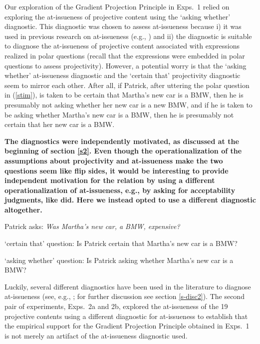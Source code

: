 \documentclass[11pt,fleqn]{article}
\newcommand{\6}{\mbox{$[\hspace*{-.6mm}[$}}
\newcommand{\9}{\mbox{$]\hspace*{-.6mm}]$}}
\begin{document}
Our exploration of the Gradient Projection Principle in Exps.~1 relied on exploring the at-issueness of projective content using the `asking whether' diagnostic. This diagnostic was chosen to assess at-issueness because i) it was used in previous research on at-issueness (e.g., \citealt{amaral-etal07,tonhauser-sula6}) and ii) the diagnostic is suitable to diagnose the at-issueness of projective content associated with expressions realized in polar questions (recall that the expressions were embedded in polar questions to assess projectivity). However, a potential worry is that the `asking whether' at-issueness diagnostic and the `certain that' projectivity diagnostic seem to mirror each other. After all, if Patrick, after uttering the polar question in (\ref{stim}), is taken to be certain that Martha's new car is a BMW, then he is presumably not asking whether her new car is a new BMW, and if he is taken to be asking whether Martha's new car is a BMW, then he is presumably not certain that her new car is a BMW.

{\bf The diagnostics were independently motivated, as discussed at the beginning of section \ref{s2}. Even though the operationalization of the assumptions about projectivity and at-issueness make the two questions seem like flip sides, it would be interesting to provide independent motivation for the relation by using a different operationalization of at-issueness, e.g., by asking for acceptability judgments, like \citealt{amaral-etal07} did. Here we instead opted to use a different diagnostic altogether.}

\begin{exe}

\exi{(\ref{stim})} Patrick asks: {\em Was Martha's new car, a BMW, expensive?} 

\begin{xlist}
\ex `certain that' question: Is Patrick certain that Martha's new car is a BMW?

\ex `asking whether' question: Is Patrick asking whether Martha's new car is a BMW?

\end{xlist}

\end{exe}
Luckily, several different diagnostics have been used in the literature to diagnose at-issueness (see, e.g., \citealt{tonhauser-sula6}; for further discussion see section \ref{s-disc2}). The second pair of experiments, Exps.~2a and 2b, explored the at-issueness of the 19 projective contents using a different diagnostic for at-issueness to establish that the empirical support for the Gradient Projection Principle obtained in Exps.~1 is not merely an artifact of the at-issueness diagnostic used.
\end{document}
